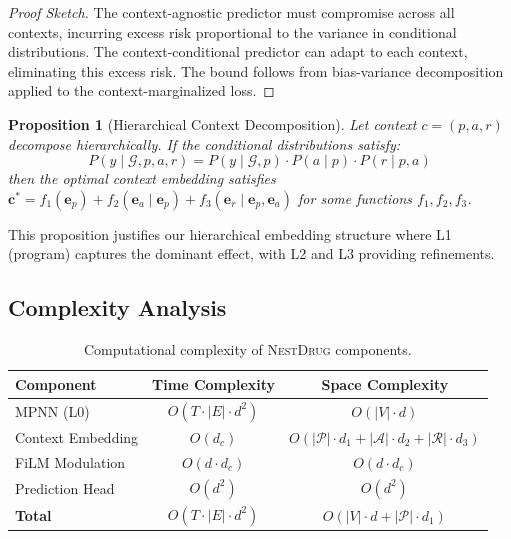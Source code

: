 \documentclass[sigconf]{acmart}
\newcommand{\methodname}{\textsc{NestDrug}}
\newtheorem{proposition}[theorem]{Proposition}
\begin{document}
\begin{proof}[Proof Sketch]
The context-agnostic predictor must compromise across all contexts, incurring excess risk proportional to the variance in conditional distributions. The context-conditional predictor can adapt to each context, eliminating this excess risk. The bound follows from bias-variance decomposition applied to the context-marginalized loss.
\end{proof}

\begin{proposition}[Hierarchical Context Decomposition]
\label{prop:hierarchy}
Let context $c = (p, a, r)$ decompose hierarchically. If the conditional distributions satisfy:
\begin{equation}
    P(y \mid \mathcal{G}, p, a, r) = P(y \mid \mathcal{G}, p) \cdot P(a \mid p) \cdot P(r \mid p, a)
\end{equation}
then the optimal context embedding satisfies $\mathbf{c}^* = f_1(\mathbf{e}_p) + f_2(\mathbf{e}_a \mid \mathbf{e}_p) + f_3(\mathbf{e}_r \mid \mathbf{e}_p, \mathbf{e}_a)$ for some functions $f_1, f_2, f_3$.
\end{proposition}

This proposition justifies our hierarchical embedding structure where L1 (program) captures the dominant effect, with L2 and L3 providing refinements.

\subsection{Complexity Analysis}

\begin{table}[h]
\caption{Computational complexity of \methodname{} components.}
\label{tab:complexity}
\centering
\small
\begin{tabular}{@{}lcc@{}}
\toprule
Component & Time Complexity & Space Complexity \\
\midrule
MPNN (L0) & $O(T \cdot |E| \cdot d^2)$ & $O(|V| \cdot d)$ \\
Context Embedding & $O(d_c)$ & $O(|\mathcal{P}| \cdot d_1 + |\mathcal{A}| \cdot d_2 + |\mathcal{R}| \cdot d_3)$ \\
FiLM Modulation & $O(d \cdot d_c)$ & $O(d \cdot d_c)$ \\
Prediction Head & $O(d^2)$ & $O(d^2)$ \\
\midrule
\textbf{Total} & $O(T \cdot |E| \cdot d^2)$ & $O(|V| \cdot d + |\mathcal{P}| \cdot d_1)$ \\
\bottomrule
\end{tabular}
\end{table}
\end{document}

